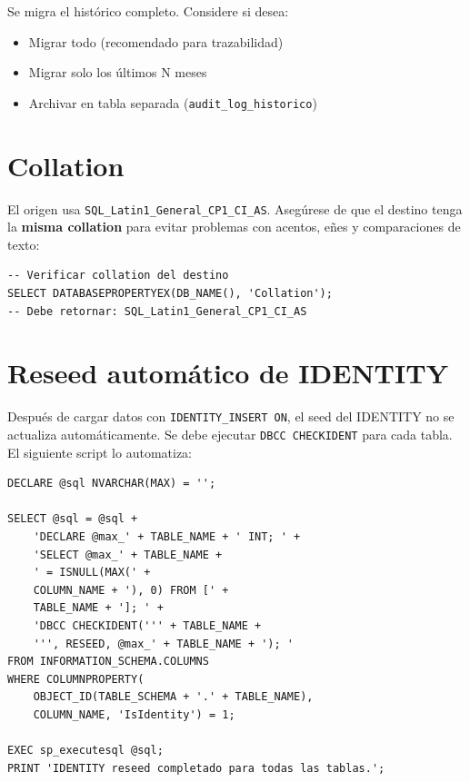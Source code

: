 \documentclass[12pt,a4paper,twoside]{report}
\begin{document}
Se migra el hist\'orico completo. Considere si desea:
\begin{itemize}[noitemsep]
    \item Migrar todo (recomendado para trazabilidad)
    \item Migrar solo los \'ultimos N meses
    \item Archivar en tabla separada (\texttt{audit\_log\_historico})
\end{itemize}

\section{Collation}

El origen usa \texttt{SQL\_Latin1\_General\_CP1\_CI\_AS}. Aseg\'urese de que el destino tenga la \textbf{misma collation} para evitar problemas con acentos, e\~nes y comparaciones de texto:

\begin{lstlisting}[style=sqlstyle]
-- Verificar collation del destino
SELECT DATABASEPROPERTYEX(DB_NAME(), 'Collation');
-- Debe retornar: SQL_Latin1_General_CP1_CI_AS
\end{lstlisting}

\section{Reseed autom\'atico de IDENTITY}

Despu\'es de cargar datos con \texttt{IDENTITY\_INSERT ON}, el seed del IDENTITY no se actualiza autom\'aticamente. Se debe ejecutar \texttt{DBCC CHECKIDENT} para cada tabla. El siguiente script lo automatiza:

\begin{lstlisting}[style=sqlstyle, caption={Reseed autom\'atico de todas las tablas}]
DECLARE @sql NVARCHAR(MAX) = '';

SELECT @sql = @sql +
    'DECLARE @max_' + TABLE_NAME + ' INT; ' +
    'SELECT @max_' + TABLE_NAME +
    ' = ISNULL(MAX(' +
    COLUMN_NAME + '), 0) FROM [' +
    TABLE_NAME + ']; ' +
    'DBCC CHECKIDENT(''' + TABLE_NAME +
    ''', RESEED, @max_' + TABLE_NAME + '); '
FROM INFORMATION_SCHEMA.COLUMNS
WHERE COLUMNPROPERTY(
    OBJECT_ID(TABLE_SCHEMA + '.' + TABLE_NAME),
    COLUMN_NAME, 'IsIdentity') = 1;

EXEC sp_executesql @sql;
PRINT 'IDENTITY reseed completado para todas las tablas.';
\end{lstlisting}

\end{document}
